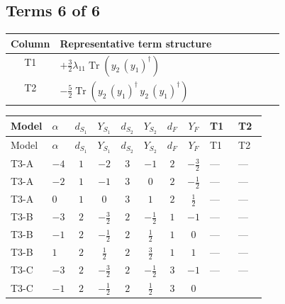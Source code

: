 \documentclass[8pt]{article}
\begin{document}
\begin{landscape}
\subsection*{Terms 6 of 6}
\begin{center}
\begin{tabular}{@{}c >{\raggedright\arraybackslash}p{0.82\linewidth}@{}}
\toprule
Column & Representative term structure \\
\midrule
T1 & \(\displaystyle +\frac{3}{2} {\lambda_{11}} \operatorname{Tr}\!\left({y_2}\,\left({y_1}\right)^{\dagger}\right)\) \\
\midrule
T2 & \(\displaystyle -\frac{5}{2} \operatorname{Tr}\!\left({y_2}\,\left({y_1}\right)^{\dagger}\,{y_2}\,\left({y_1}\right)^{\dagger}\right)\) \\
\midrule
\bottomrule
\end{tabular}
\end{center}
\smallskip
\tiny
\begin{longtable}{@{}llcccccc >{\raggedright\arraybackslash}p{0.21\linewidth} >{\raggedright\arraybackslash}p{0.21\linewidth}@{}}
\toprule
Model & $\alpha$ & $d_{S_1}$ & $Y_{S_1}$ & $d_{S_2}$ & $Y_{S_2}$ & $d_F$ & $Y_F$ & T1 & T2 \\
\midrule
\endfirsthead
\toprule
Model & $\alpha$ & $d_{S_1}$ & $Y_{S_1}$ & $d_{S_2}$ & $Y_{S_2}$ & $d_F$ & $Y_F$ & T1 & T2 \\
\midrule
\endhead
T3-A & $-4$ & $1$ & $-2$ & $3$ & $-1$ & $2$ & $-\frac{3}{2}$ & --- & --- \\
\midrule
T3-A & $-2$ & $1$ & $-1$ & $3$ & $0$ & $2$ & $-\frac{1}{2}$ & --- & --- \\
\midrule
T3-A & $0$ & $1$ & $0$ & $3$ & $1$ & $2$ & $\frac{1}{2}$ & --- & --- \\
\midrule
T3-B & $-3$ & $2$ & $-\frac{3}{2}$ & $2$ & $-\frac{1}{2}$ & $1$ & $-1$ & --- & --- \\
\midrule
T3-B & $-1$ & $2$ & $-\frac{1}{2}$ & $2$ & $\frac{1}{2}$ & $1$ & $0$ & --- & --- \\
\midrule
T3-B & $1$ & $2$ & $\frac{1}{2}$ & $2$ & $\frac{3}{2}$ & $1$ & $1$ & --- & --- \\
\midrule
T3-C & $-3$ & $2$ & $-\frac{3}{2}$ & $2$ & $-\frac{1}{2}$ & $3$ & $-1$ & --- & --- \\
\midrule
T3-C & $-1$ & $2$ & $-\frac{1}{2}$ & $2$ & $\frac{1}{2}$ & $3$ & $0$ & \scriptsize\adjustbox{max width=\linewidth}{$\begin{gathered} +\frac{3}{2} {\lambda_{11}} \operatorname{Tr}\!\left({y_2}\,\left({y_1}\right)^{\dagger}\right)\end{gathered}$} & \scriptsize\adjustbox{max width=\linewidth}{$\begin{gathered} -\frac{5}{2} \operatorname{Tr}\!\left({y_2}\,\left({y_1}\right)^{\dagger}\,{y_2}\,\left({y_1}\right)^{\dagger}\right)\end{gathered}$} \\

\end{longtable}
\end{landscape}
\end{document}

